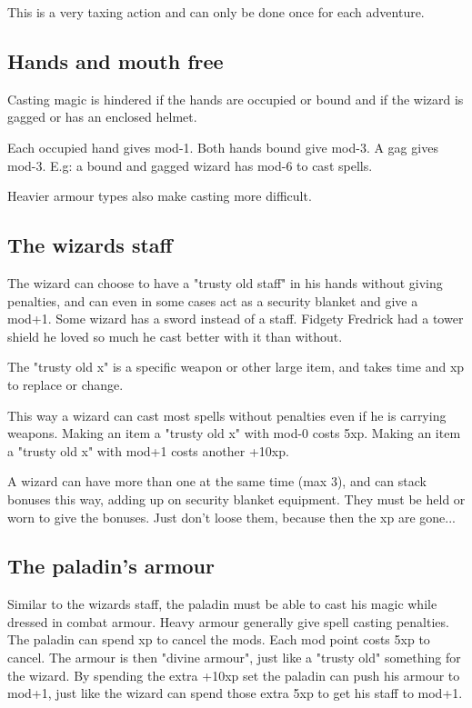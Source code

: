This is a very taxing action and can only be done once for each adventure.


\subsection*{Hands and mouth free}
Casting magic is hindered if the hands are occupied or bound and if the wizard is gagged or has an enclosed helmet.

Each occupied hand gives mod-1. Both hands bound give mod-3. A gag gives mod-3.
E.g: a bound and gagged wizard has mod-6 to cast spells.

Heavier armour types also make casting more difficult.


\subsection*{The wizards staff}
The wizard can choose to have a "trusty old staff" in his hands without giving penalties, and can even in some cases act as a security blanket and give a mod+1. Some wizard has a sword instead of a staff. Fidgety Fredrick had a tower shield he loved so much he cast better with it than without.

The "trusty old x" is a specific weapon or other large item, and takes time and xp to replace or change.

This way a wizard can cast most spells without penalties even if he is carrying weapons. Making an item a "trusty old x" with mod-0 costs 5xp. Making an item a "trusty old x" with mod+1 costs another +10xp.

A wizard can have more than one at the same time (max 3), and can stack bonuses this way, adding up on security blanket equipment. They must be held or worn to give the bonuses. Just don't loose them, because then the xp are gone...


\subsection*{The paladin's armour}
Similar to the wizards staff, the paladin must be able to cast his magic while dressed in combat armour. Heavy armour generally give spell casting penalties. The paladin can spend xp to cancel the mods. Each mod point costs 5xp to cancel. The armour is then "divine armour", just like a "trusty old" something for the wizard. By spending the extra +10xp set the paladin can push his armour to mod+1, just like the wizard can spend those extra 5xp to get his staff to mod+1.

